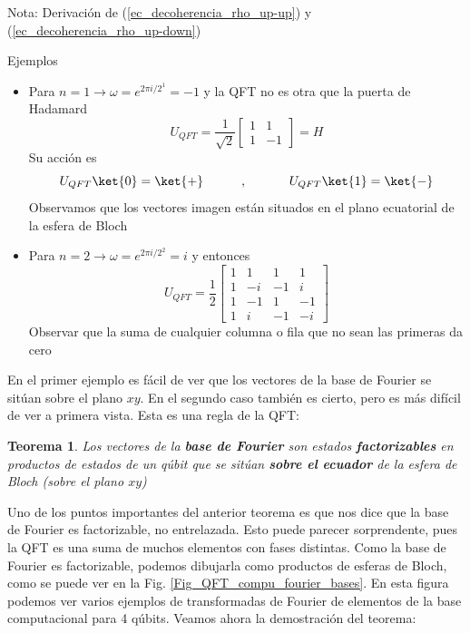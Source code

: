 \documentclass[a4paper,11pt]{book} %
\newtheorem{teorema_contador}{Teorema}
\newcommand{\Teorema}[1]{
		\begin{mybox_gray2}{}
			\begin{teorema_contador}
				 #1 
			\end{teorema_contador} 
		\end{mybox_gray2}
	}
\numberwithin{equation}{chapter}
\begin{document}
\begin{mybox_blue}{Nota: Derivación de (\ref{ec_decoherencia_rho_up-up}) y  (\ref{ec_decoherencia_rho_up-down})}
	\begin{mybox_green}{Ejemplos}
	\begin{itemize}
		\item 	Para $n=1 \to \omega = e^{2\pi i /2^1} = -1$ y la QFT no es otra que la puerta de Hadamard
	$$
	U_{QFT} = \frac{1}{\sqrt{2}}\begin{bmatrix} 1 & 1 \\ 1 & -1 \end{bmatrix} = H
	$$
	Su acción es 
	$$
	U_{QFT}\ket{0} = \ket{+}~~~~~~~~~,~~~~~~~~~~  U_{QFT}\ket{1} = \ket{-}
	$$
	Observamos que los vectores imagen están situados en el plano ecuatorial de la esfera de Bloch
		\item Para $n=2 \to  \omega = e^{2\pi i/2^2} = i$ y entonces
	$$
	U_{QFT} =\frac{1}{2}
	\begin{bmatrix} 1 & 1 & 1 & 1 \\ 1 & -i & -1 & i \\ 1 & - 1 & 1 & - 1 \\ 1 & i & -1 & -i  \end{bmatrix}
	$$ 
	Observar que la suma de cualquier columna o fila que no sean las primeras da cero
	
	\end{itemize}
	\end{mybox_green}

En el primer ejemplo es fácil de ver que los vectores de la base de Fourier se sitúan sobre el plano $xy$. 	En el segundo caso también es cierto, pero es más difícil de ver a primera vista. Esta es una regla de la QFT:

	\Teorema{
	Los vectores de la \textbf{base de Fourier} son estados \textbf{factorizables} en productos de estados de un qúbit que se sitúan \textbf{sobre el ecuador} de la esfera de Bloch (sobre el plano $xy$)
	}

Uno de los puntos importantes del anterior teorema es que nos dice que la base de Fourier es factorizable, no entrelazada. Esto puede parecer sorprendente, pues la QFT es una suma de muchos elementos con fases distintas. Como la base de Fourier es factorizable, podemos dibujarla como productos de esferas de Bloch, como se puede ver en la Fig. \ref{Fig_QFT_compu_fourier_bases}. En esta figura podemos ver varios ejemplos de transformadas de Fourier de elementos de la base computacional para 4 qúbits. Veamos ahora la demostración del teorema:


\end{mybox_blue}
\end{document}
